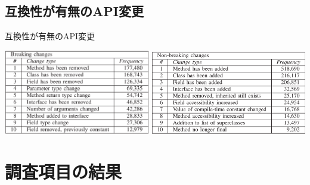 \subsection{互換性が有無のAPI変更}
\begin{frame}{互換性が有無のAPI変更}

\includegraphics[width=0.48\textwidth]{table2a}
\includegraphics[width=0.51\textwidth]{table2b}

\begin{overlayarea}{\textwidth}{0.5\textheight}
\end{overlayarea}
\end{frame}
\section{調査項目の結果}
